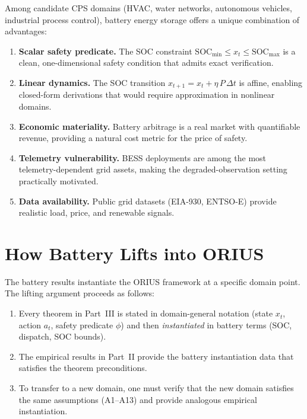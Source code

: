 Among candidate CPS domains (HVAC, water networks, autonomous vehicles,
industrial process control), battery energy storage offers a unique
combination of advantages:

\begin{enumerate}
  \item \textbf{Scalar safety predicate.}  The SOC constraint
    $\text{SOC}_{\min} \le x_t \le \text{SOC}_{\max}$ is a clean,
    one-dimensional safety condition that admits exact verification.
  \item \textbf{Linear dynamics.}  The SOC transition
    $x_{t+1} = x_t + \eta\,P\,\Delta t$ is affine, enabling closed-form
    derivations that would require approximation in nonlinear domains.
  \item \textbf{Economic materiality.}  Battery arbitrage is a real
    market with quantifiable revenue, providing a natural cost metric
    for the price of safety.
  \item \textbf{Telemetry vulnerability.}  BESS deployments are
    among the most telemetry-dependent grid assets, making the
    degraded-observation setting practically motivated.
  \item \textbf{Data availability.}  Public grid datasets (EIA-930,
    ENTSO-E) provide realistic load, price, and renewable signals.
\end{enumerate}

\section{How Battery Lifts into ORIUS}

The battery results instantiate the ORIUS framework at a specific
domain point.  The lifting argument proceeds as follows:

\begin{enumerate}
  \item Every theorem in Part~III is stated in domain-general notation
    (state $x_t$, action $a_t$, safety predicate $\phi$) and then
    \emph{instantiated} in battery terms (SOC, dispatch, SOC bounds).
  \item The empirical results in Part~II provide the battery instantiation
    data that satisfies the theorem preconditions.
  \item To transfer to a new domain, one must verify that the new
    domain satisfies the same assumptions (A1--A13) and provide
    analogous empirical instantiation.
\end{enumerate}

